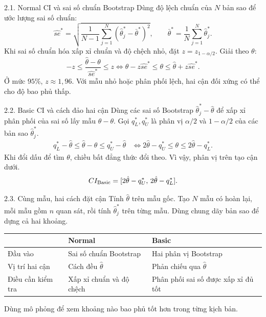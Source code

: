 \documentclass[aspectratio=43,10pt]{beamer}
\newcommand{\slidesource}{}
\begin{document}
\renewcommand{\slidesource}{Nguồn: Báo cáo nhóm D, tr. 5, 7; Bài giảng Ch. 4, tr. 52--54}
\begin{frame}{2.1. Normal CI và sai số chuẩn Bootstrap}
    Dùng độ lệch chuẩn của $N$ bản sao để ước lượng sai số chuẩn:
    \[
    \widehat{se}^{*}=
    \sqrt{\frac{1}{N-1}\sum_{j=1}^{N}(\hat\theta_j^*-\bar\theta^*)^2},
    \qquad \bar\theta^*=\frac1N\sum_{j=1}^{N}\hat\theta_j^*.
    \]
    Khi sai số chuẩn hóa xấp xỉ chuẩn và độ chệch nhỏ, đặt
    $z=z_{1-\alpha/2}$. Giải theo $\theta$:
    \[
    -z\le\frac{\hat\theta-\theta}{\widehat{se}^*}\le z
    \iff
    \hat\theta-z\widehat{se}^*\le\theta\le\hat\theta+z\widehat{se}^*.
    \]
    Ở mức $95\%$, $z\approx1{,}96$. Với mẫu nhỏ hoặc phân phối lệch, hai cận đối xứng có thể cho độ bao phủ thấp.
\end{frame}

\renewcommand{\slidesource}{Nguồn: Báo cáo nhóm D, tr. 7--8}
\begin{frame}{2.2. Basic CI và cách đảo hai cận}
    Dùng các sai số Bootstrap $\hat\theta_j^*-\hat\theta$ để xấp xỉ phân phối của sai số lấy mẫu $\hat\theta-\theta$.
    Gọi $q_L^*,q_U^*$ là phân vị $\alpha/2$ và $1-\alpha/2$ của các bản sao $\hat\theta_j^*$.
    \[
    \begin{aligned}
    q_L^*-\hat\theta\le \hat\theta-\theta\le q_U^*-\hat\theta
    &\iff 2\hat\theta-q_U^*\le\theta\le 2\hat\theta-q_L^*.
    \end{aligned}
    \]
    Khi đổi dấu để tìm $\theta$, chiều bất đẳng thức đổi theo. Vì vậy, phân vị trên tạo cận dưới.
    \[
    CI_{\rm Basic}=[2\hat\theta-q_U^*,\,2\hat\theta-q_L^*].
    \]
\end{frame}

\renewcommand{\slidesource}{Nguồn: Báo cáo nhóm D, tr. 9--10}
\begin{frame}{2.3. Cùng mẫu, hai cách đặt cận}
    Tính $\hat\theta$ trên mẫu gốc. Tạo $N$ mẫu có hoàn lại, mỗi mẫu gồm $n$ quan sát, rồi tính $\hat\theta_j^*$ trên từng mẫu. Dùng chung dãy bản sao để dựng cả hai khoảng.
    \medskip

    \centering\small
    \begin{tabular}{lp{3.9cm}p{3.9cm}}
    \toprule & Normal & Basic\\ \midrule
    Đầu vào & Sai số chuẩn Bootstrap & Hai phân vị Bootstrap\\
    Vị trí hai cận & Cách đều $\hat\theta$ & Phản chiếu qua $\hat\theta$\\
    Điều cần kiểm tra & Xấp xỉ chuẩn và độ chệch & Phân phối sai số được xấp xỉ đủ tốt\\ \bottomrule
    \end{tabular}\par
    \medskip\raggedright
    Dùng mô phỏng để xem khoảng nào bao phủ tốt hơn trong từng kịch bản.
\end{frame}
\end{document}
